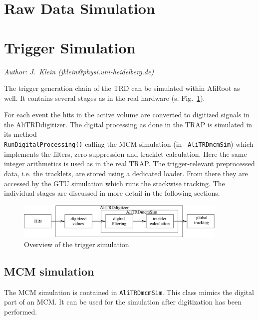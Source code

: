 \documentclass{alicetdr}
\begin{document}
\section{Raw Data Simulation}
\label{RAWSIM}
%
\section{Trigger Simulation}
\label{TRGSIM}
{\it Author: J.~Klein (jklein@physi.uni-heidelberg.de)}
\vspace{.3cm}

The trigger generation chain of the TRD can be simulated within
AliRoot as well. It contains several stages as in the real
hardware (s. Fig.~\ref{fig:trgsim}). 

For each event the hits in the active volume are converted to
digitized signals in the AliTRDdigitizer. The digital processing as
done in the TRAP is simulated in its method \\
{\tt RunDigitalProcessing()} calling the MCM simulation (in {\tt
  AliTRDmcmSim}) which implements the filters, zero-suppression and
tracklet calculation. Here the same integer arithmetics is used as in
the real TRAP. The trigger-relevant preprocessed data, i.e. the
tracklets, are stored using a dedicated loader. From there they are
accessed by the GTU simulation which runs the stackwise tracking. The
individual stages are discussed in more detail in the following
sections.
\begin{figure}
\begin{center}
\includegraphics[angle=0,width=0.9\textwidth]{plots/trgsim_ov}
\end{center}
\caption[Trigger simulation overview]{Overview of the trigger
  simulation}
\label{fig:trgsim}
\end{figure}

\subsection{MCM simulation}
The MCM simulation is contained in {\tt AliTRDmcmSim}. This class
mimics the digital part of an MCM. It can be used for the simulation
after digitization has been performed.
\end{document}
